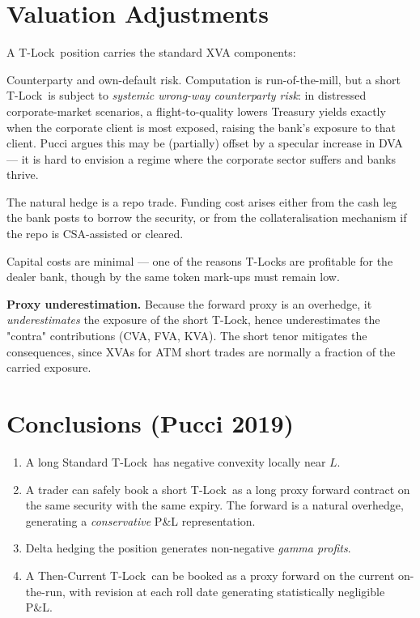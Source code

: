 \documentclass[11pt]{article}
\theoremstyle{definition}
\newcommand{\Tlock}{T-Lock}
\begin{document}
\section{Valuation Adjustments}\label{sec:xva}

A \Tlock\ position carries the standard XVA components:

\begin{description}[leftmargin=1.6em,itemsep=2pt]
\item[CVA / DVA.] Counterparty and own-default risk. Computation is
run-of-the-mill, but a short \Tlock\ is subject to \emph{systemic
wrong-way counterparty risk}: in distressed corporate-market scenarios,
a flight-to-quality lowers Treasury yields exactly when the corporate
client is most exposed, raising the bank's exposure to that client.
Pucci argues this may be (partially) offset by a specular increase in
DVA --- it is hard to envision a regime where the corporate sector
suffers and banks thrive.

\item[FVA.] The natural hedge is a repo trade. Funding cost arises
either from the cash leg the bank posts to borrow the security, or from
the collateralisation mechanism if the repo is CSA-assisted or cleared.

\item[KVA.] Capital costs are minimal --- one of the reasons \Tlock s
are profitable for the dealer bank, though by the same token mark-ups
must remain low.
\end{description}

\textbf{Proxy underestimation.} Because the forward proxy is an
overhedge, it \emph{underestimates} the exposure of the short \Tlock,
hence underestimates the "contra" contributions (CVA, FVA, KVA).
The short tenor mitigates the consequences, since XVAs for ATM short
trades are normally a fraction of the carried exposure.


\section{Conclusions (Pucci 2019)}

\begin{enumerate}[leftmargin=1.6em,itemsep=2pt]
\item A long Standard \Tlock\ has negative convexity locally near $L$.
\item A trader can safely book a short \Tlock\ as a long proxy forward
      contract on the same security with the same expiry. The forward
      is a natural overhedge, generating a \emph{conservative} P\&L
      representation.
\item Delta hedging the position generates non-negative \emph{gamma
      profits}.
\item A Then-Current \Tlock\ can be booked as a proxy forward on the
      current on-the-run, with revision at each roll date generating
      statistically negligible P\&L.
\end{enumerate}
\end{document}
